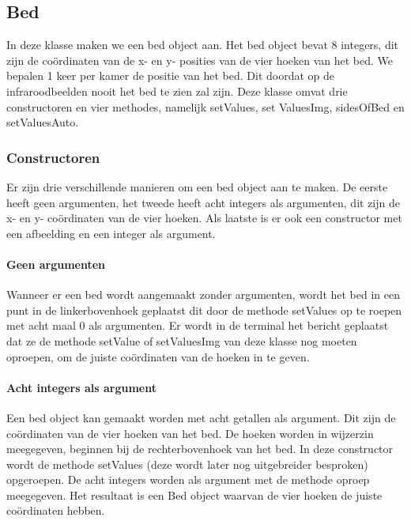\subsection{Bed}
\label{mRefBed}
In deze klasse maken we een bed object aan. Het bed object bevat 8 integers, dit zijn de co\"ordinaten van de x- en y- posities van de vier hoeken van het bed. We bepalen 1 keer per kamer de positie van het bed. Dit doordat op de infraroodbeelden nooit het bed te zien zal zijn. Deze klasse omvat drie constructoren en vier methodes, namelijk setValues, set ValuesImg, sidesOfBed en setValuesAuto.

\subsubsection{Constructoren}
Er zijn drie verschillende manieren om een bed object aan te maken. De eerste heeft geen argumenten, het tweede heeft acht integers als argumenten, dit zijn de x- en y- co\"ordinaten van de vier hoeken. Als laatste is er ook een constructor met een afbeelding en een integer als argument.

\paragraph{Geen argumenten}
Wanneer er een bed wordt aangemaakt zonder argumenten, wordt het bed in een punt in de linkerbovenhoek geplaatst dit door de methode setValues op te roepen met acht maal 0 als argumenten. Er wordt in de terminal het bericht geplaatst dat ze de methode setValue of setValuesImg van deze klasse nog moeten oproepen, om de juiste co\"ordinaten van de hoeken in te geven. 

\paragraph{Acht integers als argument}
Een bed object kan gemaakt worden met acht getallen als argument. Dit zijn de co\"ordinaten van de vier hoeken van het bed. De hoeken worden in wijzerzin meegegeven, beginnen bij de rechterbovenhoek van het bed. In deze constructor wordt de methode setValues (deze wordt later nog uitgebreider besproken) opgeroepen. De acht integers worden als argument met de methode oproep meegegeven. Het resultaat is een Bed object waarvan de vier hoeken de juiste co\"ordinaten hebben.

